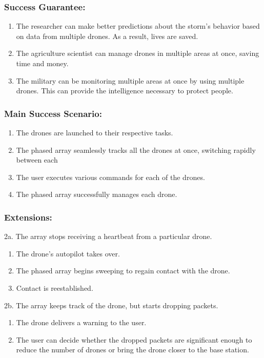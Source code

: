 \documentclass[ProductRequirements.tex]{subfiles}
\begin{document}
	\subsubsection*{Success Guarantee:}
	\begin{enumerate}
		\item The researcher can make better predictions about the storm's behavior based on data from multiple drones. As a result, lives are saved.
		\item The agriculture scientist can manage drones in multiple areas at once, saving time and money.
		\item The military can be monitoring multiple areas at once by using multiple drones. This can provide the intelligence necessary to protect people.
	\end{enumerate}
	\subsubsection*{Main Success Scenario:}
	\begin{enumerate}\itemsep1pt
		\item The drones are launched to their respective tasks.
		\item The phased array seamlessly tracks all the drones at once, switching rapidly between each
		\item The user executes various commands for each of the drones.
		\item The phased array successfully manages each drone.
	\end{enumerate}
	\subsubsection*{Extensions:}
	2a. The array stops receiving a heartbeat from a particular drone.
	\begin{enumerate}
		\item The drone's autopilot takes over.
		\item The phased array begins sweeping to regain contact with the drone.
		\item Contact is reestablished.
	\end{enumerate}
	2b. The array keeps track of the drone, but starts dropping packets.
	\begin{enumerate}
		\item The drone delivers a warning to the user.
		\item The user can decide whether the dropped packets are significant enough to reduce the number of drones or bring the drone closer to the base station.
	\end{enumerate}
\end{document}
